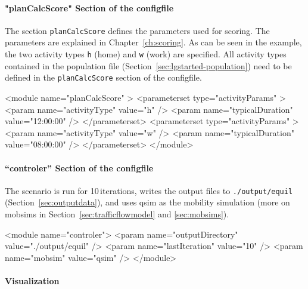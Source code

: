 
\paragraph{"planCalcScore" Section of the \gls{configfile}}

The section \lstinline|planCalcScore| defines the parameters used for scoring. The parameters are explained in Chapter~\ref{ch:scoring}. As can be seen in the example, the two activity types \lstinline|h| (home) and \lstinline|w| (work) are specified.  All activity types contained in the population file (\cf Section~\ref{sec:lgstarted-population}) need to be defined in the \lstinline{planCalcScore} section of the \gls{configfile}.
\begin{xml}
<module name="planCalcScore" >
   <parameterset type="activityParams" >
      <param name="activityType" value="h" />
      <param name="typicalDuration" value="12:00:00" />
   </parameterset>
   <parameterset type="activityParams" >
      <param name="activityType" value="w" />
      <param name="typicalDuration" value="08:00:00" />
   </parameterset>
</module>
\end{xml}

\paragraph{``controler'' Section of the \gls{configfile}}

The scenario is run for 10\,iterations, writes the output files to \lstinline|./output/equil| (Section~\ref{sec:outputdata}), and uses \gls{qsim} as the mobility simulation (more on \glspl{mobsim} in Section~\ref{sec:trafficflowmodel} and \ref{sec:mobsims}).
\begin{xml}
<module name="controler">
	<param name="outputDirectory" value="./output/equil" />
	<param name="lastIteration" value="10" />
	<param name="mobsim" value="qsim" />	
</module>
\end{xml}


\paragraph{Visualization}

